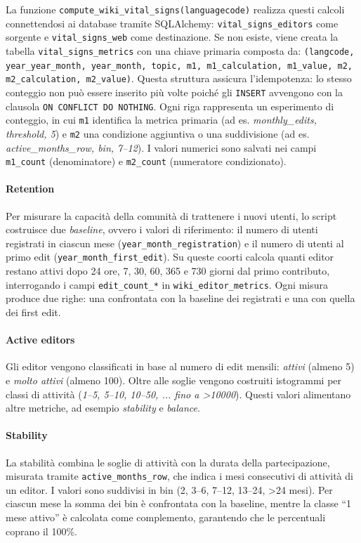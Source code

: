 La funzione \texttt{compute\_wiki\_vital\_signs(languagecode)} realizza questi calcoli connettendosi ai database tramite SQLAlchemy: 
\texttt{vital\_signs\_editors} come sorgente e \texttt{vital\_signs\_web} come destinazione. 
Se non esiste, viene creata la tabella \texttt{vital\_signs\_metrics} con una chiave primaria composta da: 
\texttt{(langcode, year\_year\_month, year\_month, topic, m1, m1\_calculation, m1\_value, m2, m2\_calculation, m2\_value)}. 
Questa struttura assicura l’idempotenza: lo stesso conteggio non può essere inserito più volte poiché gli \texttt{INSERT} avvengono con la clausola \texttt{ON CONFLICT DO NOTHING}. 
Ogni riga rappresenta un esperimento di conteggio, in cui \texttt{m1} identifica la metrica primaria (ad es. \emph{monthly\_edits, threshold, 5}) e \texttt{m2} una condizione aggiuntiva o una suddivisione (ad es. \emph{active\_months\_row, bin, 7--12}). I valori numerici sono salvati nei campi \texttt{m1\_count} (denominatore) e \texttt{m2\_count} (numeratore condizionato).

\paragraph{Retention}  
Per misurare la capacità della comunità di trattenere i nuovi utenti, lo script costruisce due \emph{baseline}, ovvero i valori di riferimento: il numero di utenti registrati in ciascun mese (\texttt{year\_month\_registration}) e il numero di utenti al primo edit (\texttt{year\_month\_first\_edit}). 
Su queste coorti calcola quanti editor restano attivi dopo 24 ore, 7, 30, 60, 365 e 730 giorni dal primo contributo, interrogando i campi \texttt{edit\_count\_*} in \texttt{wiki\_editor\_metrics}. 
Ogni misura produce due righe: una confrontata con la baseline dei registrati e una con quella dei first edit.

\paragraph{Active editors}  
Gli editor vengono classificati in base al numero di edit mensili: \emph{attivi} (almeno 5) e \emph{molto attivi} (almeno 100). 
Oltre alle soglie vengono costruiti istogrammi per classi di attività (\emph{1--5, 5--10, 10--50, ... fino a \textgreater 10000}). 
Questi valori alimentano altre metriche, ad esempio \emph{stability} e \emph{balance}.

\paragraph{Stability}  
La stabilità combina le soglie di attività con la durata della partecipazione, misurata tramite \texttt{active\_months\_row}, che indica i mesi consecutivi di attività di un editor. 
I valori sono suddivisi in bin (2, 3--6, 7--12, 13--24, \textgreater 24 mesi). 
Per ciascun mese la somma dei bin è confrontata con la baseline, mentre la classe ``1 mese attivo'' è calcolata come complemento, garantendo che le percentuali coprano il 100\%.

